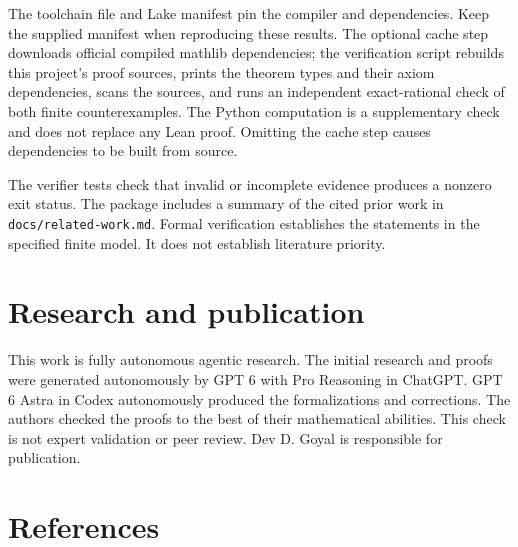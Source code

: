 \documentclass[
  american,
  11pt,
]{article}
\begin{document}
The toolchain file and Lake manifest pin the compiler and dependencies.
Keep the supplied manifest when reproducing these results. The optional
cache step downloads official compiled mathlib dependencies; the
verification script rebuilds this project's proof sources, prints the
theorem types and their axiom dependencies, scans the sources, and runs
an independent exact-rational check of both finite counterexamples. The
Python computation is a supplementary check and does not replace any
Lean proof. Omitting the cache step causes dependencies to be built from
source.

The verifier tests check that invalid or incomplete evidence produces a
nonzero exit status. The package includes a summary of the cited prior
work in \texttt{docs/related-work.md}. Formal verification establishes
the statements in the specified finite model. It does not establish
literature priority.

\section*{Research and publication}\label{authorship-and-assistance}

This work is fully autonomous agentic research. The initial research and proofs were generated autonomously by GPT 6 with Pro Reasoning in ChatGPT. GPT 6 Astra in Codex autonomously produced the formalizations and corrections. The authors checked the proofs to the best of their mathematical abilities. This check is not expert validation or peer review. Dev D. Goyal is responsible for publication.

\section*{References}\label{references}
\end{document}
